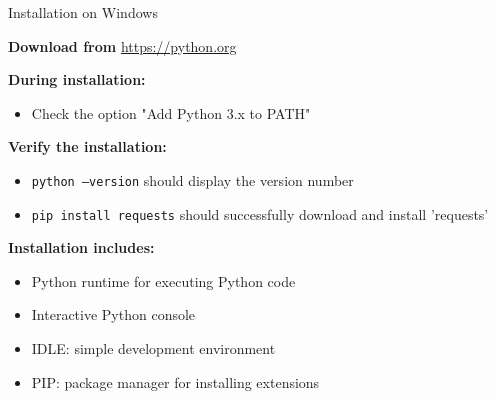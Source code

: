 \documentclass[
	11pt, 
]{beamer}
\begin{document}
\begin{frame}{Installation on Windows}

    \textbf{Download from} \url{https://python.org} \smallskip
    
    \textbf{During installation:}
    \begin{itemize}
        \item Check the option "Add Python 3.x to PATH"
    \end{itemize} \smallskip

    \textbf{Verify the installation:}
    \begin{itemize}
        \item \texttt{python --version} should display the version number
        \item \texttt{pip install requests} should successfully download and install 'requests'
    \end{itemize} \smallskip

    \textbf{Installation includes:}
    \begin{itemize}
        \item Python runtime for executing Python code
        \item Interactive Python console
        \item IDLE: simple development environment
        \item PIP: package manager for installing extensions
    \end{itemize}
\end{frame}

\end{document}

